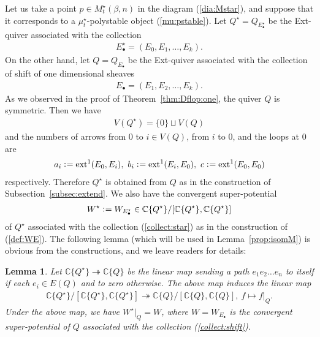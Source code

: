 \documentclass[11pt]{amsart}
\theoremstyle{plain}
\newtheorem{lem}[thm]{Lemma}
\theoremstyle{definition}
\theoremstyle{remark}
\newcommand{\ext}{\mathop{\rm ext}\nolimits}
\begin{document}
Let us take a point 
$p \in M_{t}^{\star}(\beta, n)$ in the diagram (\ref{dia:Mstar}), 
and suppose that it corresponds 
to a $\mu_t^{\star}$-polystable object (\ref{mu:pstable}).
Let 
$Q^{\star}=Q_{E_{\bullet}^{\star}}$
be the Ext-quiver 
associated with the collection
\begin{align}\label{collect:star}
E_{\bullet}^{\star}=
(E_0, E_1, \ldots, E_k).
\end{align}
On the other hand, 
let $Q=Q_{E_{\bullet}}$ be the Ext-quiver 
associated with the collection of shift of one dimensional sheaves
\begin{align}\label{collect:shift}
E_{\bullet}=(E_1, E_2, \ldots, E_k).
\end{align}
As we observed in the proof of Theorem~\ref{thm:Dflop:one}, 
the quiver $Q$ is 
symmetric. 
Then we have
\begin{align*}
V(Q^{\star})=\{0\} \sqcup V(Q)
\end{align*}
and the numbers of arrows from $0$ to 
$i \in V(Q)$, 
from $i$ to $0$, and the loops at $0$ are
\begin{align}\label{numbers:ai}
a_i \cneq \ext^1(E_0, E_i), \ 
b_i \cneq \ext^1(E_i, E_0), \ 
c \cneq \ext^1(E_0, E_0) 
\end{align}
respectively. 
Therefore $Q^{\star}$ is obtained from $Q$ as in
the construction of Subsection~\ref{subsec:extend}. 
We also have the convergent super-potential 
\begin{align*}
W^{\star} \cneq W_{E_{\bullet}^{\star}}
\in \mathbb{C}\{ Q^{\star} \}/[\mathbb{C}\{ Q^{\star} \}, \mathbb{C}\{ Q^{\star} \}]
\end{align*}
of $Q^{\star}$ associated with the collection 
(\ref{collect:star}) as in the construction of (\ref{def:WE}). 
The following lemma (which will be used in Lemma~\ref{prop:isomM})
is obvious from the constructions, 
and we leave readers for details: 
\begin{lem}\label{rmk:W:restrict}
Let $\mathbb{C}\{Q^{\star}\} \twoheadrightarrow \mathbb{C}\{Q\}$
be the linear map sending a path
$e_1 e_2 \ldots e_n$ to itself if each $e_i \in E(Q)$
and to zero otherwise. 
The above map induces the linear map
\begin{align*}
\mathbb{C}\{ Q^{\star} \}/[\mathbb{C}\{ Q^{\star} \}, \mathbb{C}\{ Q^{\star} \}]
 \twoheadrightarrow 
 \mathbb{C}\{ Q \}/[\mathbb{C}\{ Q  \}, \mathbb{C}\{ Q\}], \ 
 f \mapsto f|_Q.
 \end{align*}
Under the above map, 
we have $W^{\star}|_{Q}=W$, 
where $W=W_{E_{\bullet}}$ is the convergent 
super-potential of $Q$
associated with the collection 
(\ref{collect:shift}). 
\end{lem}
\end{document}
